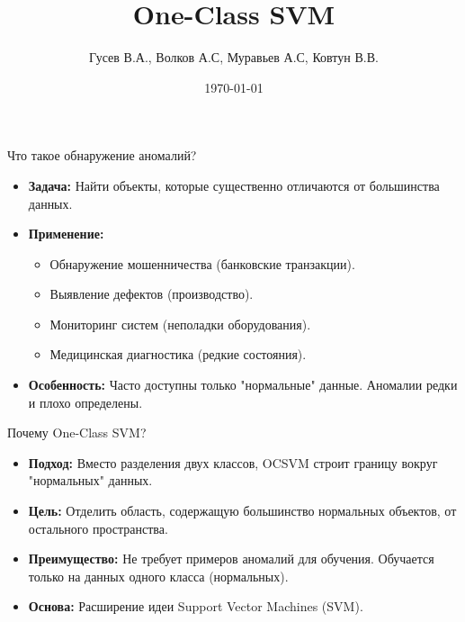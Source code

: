 \documentclass{beamer}
\begin{document}
\title{One-Class SVM}
\author{Гусев В.А., Волков А.С, Муравьев А.С, Ковтун В.В.}
\date{\today}



\begin{frame}
    \titlepage 
\end{frame}

\begin{frame}{Что такое обнаружение аномалий?}
    \begin{itemize}
        \item \textbf{Задача:} Найти объекты, которые существенно отличаются от большинства данных.
        \item \textbf{Применение:}
        \begin{itemize}
            \item Обнаружение мошенничества (банковские транзакции).
            \item Выявление дефектов (производство).
            \item Мониторинг систем (неполадки оборудования).
            \item Медицинская диагностика (редкие состояния).
        \end{itemize}
        \item \textbf{Особенность:} Часто доступны только "нормальные" данные. Аномалии редки и плохо определены.
    \end{itemize}
\end{frame}

\begin{frame}{Почему One-Class SVM?}
    \begin{itemize}
        \item \textbf{Подход:} Вместо разделения двух классов, OCSVM строит границу вокруг "нормальных" данных.
        \item \textbf{Цель:} Отделить область, содержащую большинство нормальных объектов, от остального пространства.
        \item \textbf{Преимущество:} Не требует примеров аномалий для обучения. Обучается только на данных одного класса (нормальных).
        \item \textbf{Основа:} Расширение идеи Support Vector Machines (SVM).
    \end{itemize}
\end{frame}
\end{document}
